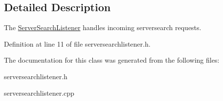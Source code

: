 \subsection{Detailed Description}
The \hyperlink{class_server_search_listener}{Server\-Search\-Listener} handles incoming serversearch requests. 

Definition at line 11 of file serversearchlistener.\-h.



The documentation for this class was generated from the following files\-:\begin{DoxyCompactItemize}
\item 
serversearchlistener.\-h\item 
serversearchlistener.\-cpp\end{DoxyCompactItemize}
